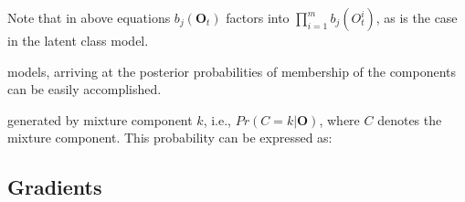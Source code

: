 \documentclass[a4paper,man,nobf]{apa}
\newcommand{\vc}{\mathbf}
\begin{document}
Note that in above equations $b_{j}(\vc{O}_{t})$ factors into 
$\prod_{i=1}^{m} b_{j} (O_{t}^{i})$, as is the case in the latent 
class model. 



models, arriving at the posterior probabilities of membership of the 
components can be easily accomplished. 


generated by mixture component $k$, i.e., $Pr(C=k|\vc{O})$, where $C$ 
denotes the mixture component. This probability can be expressed as:


\subsection{Gradients}

\newcommand{\fpp}{\frac{\partial} {\partial \lambda_{1}}}
\end{document}

